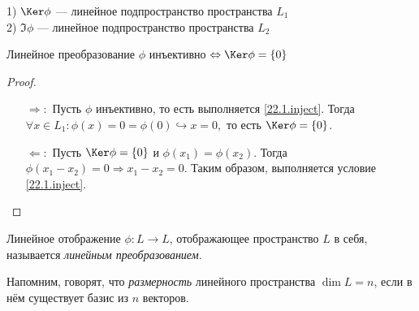   \begin{stt} $ $ \\
  1) $\Ker\phi$ --- линейное подпространство пространства $L_1$ \\
  2) $\Im\phi$ --- линейное подпространство пространства $L_2$
  \end{stt}
  \begin{thm}
  Линейное преобразование $\phi$ инъективно $\Leftrightarrow \Ker\phi=\{0\}$
  \end{thm}
  \begin{proof} $ $
  \linebreak\vspace*{-\baselineskip}
  \begin{itemize}
  \item[\underline{$\Longrightarrow:$}]   Пусть $\phi$ инъективно, то есть выполняется \eqref{22.1.inject}. Тогда \\ $\forall x\in L_1:\phi(x)=0=\phi(0) \hookrightarrow x=0,$ то есть $\Ker\phi=\{0\}$.
  \item[\underline{$\Longleftarrow:$}] 
Пусть $\Ker\phi=\{0\}$ и $\phi(x_1)=\phi(x_2)$. Тогда $\phi(x_1-x_2)=0 \Rightarrow x_1-x_2=0$. Таким образом, выполняется условие \eqref{22.1.inject}.
  \end{itemize}
  \vspace{-1.65\baselineskip}
  \end{proof}
  
  \begin{defn}
  Линейное отображение $\phi: L\rightarrow L$, отображающее пространство $L$ в себя, называется \textit{линейным преобразованием}.
  \end{defn}
  
  Напомним, говорят, что \textit{размерность} линейного пространства $\dim L = n$, если в нём существует базис из $n$ векторов.
  
